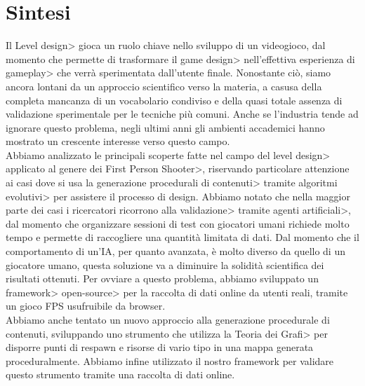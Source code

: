 \chapter{Sintesi}

Il \<Level design> gioca un ruolo chiave nello sviluppo di un videogioco, dal momento che permette di trasformare il \<game design> nell'effettiva esperienza di \<gameplay> che verrà sperimentata dall'utente finale. Nonostante ciò, siamo ancora lontani da un approccio scientifico verso la materia, a casusa della completa mancanza di un vocabolario condiviso e della quasi totale assenza di validazione sperimentale per le tecniche più comuni. Anche se l'industria tende ad ignorare questo problema, negli ultimi anni gli ambienti accademici hanno mostrato un crescente interesse verso questo campo. \\
Abbiamo analizzato le principali scoperte fatte nel campo del \<level design> applicato al genere dei \<First Person Shooter>, riservando particolare attenzione ai casi dove si usa la \<generazione procedurali di contenuti> tramite \<algoritmi evolutivi> per assistere il processo di design. Abbiamo notato che nella maggior parte dei casi i ricercatori ricorrono alla \<validazione> tramite \<agenti artificiali>, dal momento che organizzare sessioni di test con giocatori umani richiede molto tempo e permette di raccogliere una quantità limitata di dati. Dal momento che il comportamento di un'IA, per quanto avanzata, è molto diverso da quello di un giocatore umano, questa soluzione va a diminuire la solidità scientifica dei risultati ottenuti. Per ovviare a questo problema, abbiamo sviluppato un \<framework> \<open-source> per la raccolta di dati online da utenti reali, tramite un gioco FPS usufruibile da browser. \\
Abbiamo anche tentato un nuovo approccio alla generazione procedurale di contenuti, sviluppando uno strumento che utilizza la \<Teoria dei Grafi> per disporre punti di respawn e risorse di vario tipo in una mappa generata proceduralmente. Abbiamo infine utilizzato il nostro framework per validare questo strumento tramite una raccolta di dati online.